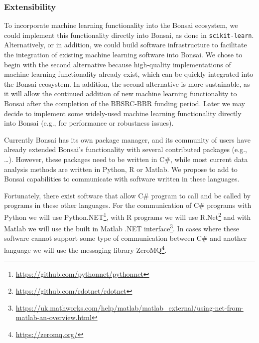 \subsubsection{Extensibility}
\label{sec:extensibility}

To incorporate machine learning functionality into the Bonsai ecosystem, we
could
implement this functionality directly into Bonsai, as done in
\texttt{scikit-learn}. Alternatively, or in addition, we could build software
infrastructure to facilitate the integration of existing machine learning
software into Bonsai. We chose to begin with the second alternative because
high-quality implementations of machine learning functionality already exist,
which can be quickly integrated into the Bonsai ecosystem. In addition, the
second alternative is more sustainable, as it will allow the continued addition
of new machine learning functionality to Bonsai after the completion of the
BBSRC-BBR funding period. Later we may decide to implement some widely-used
machine learning functionality directly into Bonsai (e.g., for performance or
robustness issues).

Currently Bonsai has its own package manager, and its community of users have
already extended Bonsai's functionality with several contributed packages
(e.g., \ldots). However, these packages need to be written in C\#, while most
current data analysis methods are written in Python, R or Matlab. We propose to
add to Bonsai capabilities to communicate with software written in these
languages.

Fortunately, there exist software that allow C\# program
to call and be called by programs in these other languages. For the
communication of C\# programs with Python we will use
Python.NET\footnote{\href{https://github.com/pythonnet/pythonnet}{https://github.com/pythonnet/pythonnet}},
with R programs we will use
R.Net\footnote{\href{https://github.com/rdotnet/rdotnet}{https://github.com/rdotnet/rdotnet}}
and with Matlab we will use the built in Matlab .NET
interface\footnote{\href{https://uk.mathworks.com/help/matlab/matlab\_external/using-net-from-matlab-an-overview.html}{https://uk.mathworks.com/help/matlab/matlab\_external/using-net-from-matlab-an-overview.html}}.
In cases where these software cannot support some type of communication between
C\# and another language we will use the messaging library
ZeroMQ\footnote{\href{https://zeromq.org/}{https://zeromq.org/}}.

